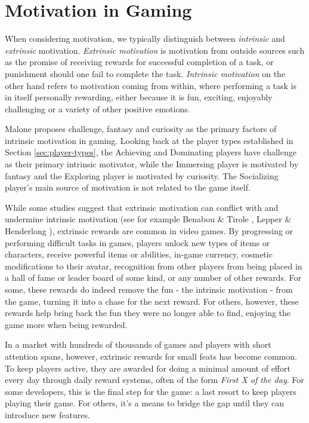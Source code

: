 
\section{Motivation in Gaming}
\label{sec:motivation-in-gaming}

When considering motivation, we typically distinguish between \emph{intrinsic} and \emph{extrinsic} motivation. \emph{Extrinsic motivation} is motivation from outside sources such as the promise of receiving rewards for successful completion of a task, or punishment should one fail to complete the task. \emph{Intrinsic motivation} on the other hand refers to motivation coming from within, where performing a task is in itself personally rewarding, either because it is fun, exciting, enjoyably challenging or a variety of other positive emotions.

Malone \cite{malone1981toward} proposes challenge, fantasy and curiosity as the primary factors of intrinsic motivation in gaming. Looking back at the player types established in Section \ref{sec:player-types}, the Achieving and Dominating players have challenge as their primary intrinsic motivator, while the Immersing player is motivated by fantasy and the Exploring player is motivated by curiosity. The Socializing player's main source of motivation is not related to the game itself.

While some studies suggest that extrinsic motivation can conflict with and undermine intrinsic motivation (see for example Benabou \& Tirole \cite{benabou2003intrinsic}, Lepper \& Henderlong \cite{lepper2000motivation}), extrinsic rewards are common in video games. By progressing or performing difficult tasks in games, players unlock new types of items or characters, receive powerful items or abilities, in-game currency, cosmetic modifications to their avatar, recognition from other players from being placed in a hall of fame or leader board of some kind, or any number of other rewards. For some, these rewards do indeed remove the fun - the intrinsic motivation - from the game, turning it into a chase for the next reward. For others, however, these rewards help bring back the fun they were no longer able to find, enjoying the game more when being rewarded.

In a market with hundreds of thousands of games and players with short attention spans, however, extrinsic rewards for small feats has become common. To keep players active, they are awarded for doing a minimal amount of effort every day through daily reward systems, often of the form \emph{First X of the day}. For some developers, this is the final step for the game: a last resort to keep players playing their game. For others, it's a means to bridge the gap until they can introduce new features.


